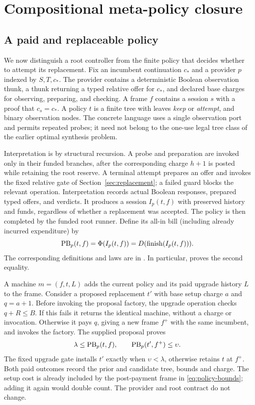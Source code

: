 \section{Compositional meta-policy closure}\label{sec:closure}
\subsection{A paid and replaceable policy}
We now distinguish a root controller from the finite policy that decides whether to attempt its replacement. Fix an incumbent continuation $c_*$ and a provider $p$ indexed by $S,T,c_*$. The provider contains a deterministic Boolean observation thunk, a thunk returning a typed relative offer for $c_*$, and declared base charges for observing, preparing, and checking. A frame $f$ contains a session $s$ with a proof that $c_s=c_*$. A policy $t$ is a finite tree with leaves \emph{keep} or \emph{attempt}, and binary observation nodes. The concrete language uses a single observation port and permits repeated probes; it need not belong to the one-use legal tree class of the earlier optimal synthesis problem.

Interpretation is by structural recursion. A probe and preparation are invoked only in their funded branches, after the corresponding charge $h+1$ is posted while retaining the root reserve. A terminal attempt prepares an offer and invokes the fixed relative gate of Section~\ref{sec:replacement}; a failed guard blocks the relevant operation. Interpretation records actual Boolean responses, prepared typed offers, and verdicts. It produces a session $I_p(t,f)$ with preserved history and funds, regardless of whether a replacement was accepted. The policy is then completed by the funded root runner. Define its all-in bill (including already incurred expenditure) by
\begin{equation}\label{eq:policy-bill}
 \operatorname{PB}_p(t,f)=\Phi(I_p(t,f))=D(\operatorname{finish}(I_p(t,f))).
\end{equation}
The corresponding definitions and laws are in . In particular,  proves the second equality.

A machine $m=(f,t,L)$ adds the current policy and its paid upgrade history $L$ to the frame. Consider a proposed replacement $t'$ with base setup charge $a$ and $q=a+1$. Before invoking the proposal factory, the upgrade operation checks $q+R\le B$. If this fails it returns the identical machine, without a charge or invocation. Otherwise it pays $q$, giving a new frame $f^+$ with the same incumbent, and invokes the factory. The supplied proposal proves
\begin{equation}\label{eq:policy-bounds}
 \lambda\le\operatorname{PB}_p(t,f),\qquad \operatorname{PB}_p(t',f^+)\le\upsilon.
\end{equation}
The fixed upgrade gate installs $t'$ exactly when $\upsilon<\lambda$, otherwise retains $t$ at $f^+$. Both paid outcomes record the prior and candidate tree, bounds and charge. The setup cost is already included by the post-payment frame in \eqref{eq:policy-bounds}; adding it again would double count. The provider and root contract do not change.

